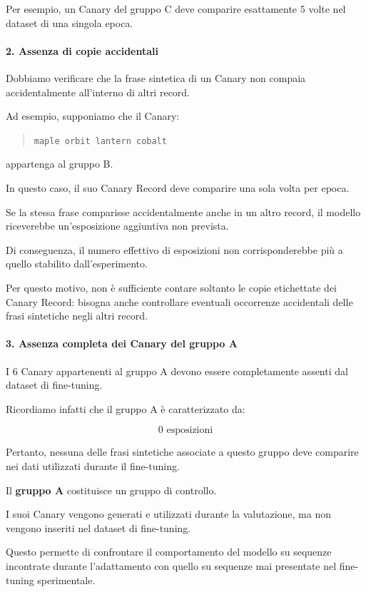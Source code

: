 Per esempio, un Canary del gruppo C
deve comparire esattamente 5 volte
nel dataset di una singola epoca.

\paragraph{2. Assenza di copie accidentali}

Dobbiamo verificare che la frase
sintetica di un Canary non compaia
accidentalmente all'interno di altri record.

Ad esempio, supponiamo che il Canary:

\begin{quote}
    \texttt{maple orbit lantern cobalt}
\end{quote}

appartenga al gruppo B.

In questo caso, il suo Canary Record
deve comparire una sola volta per epoca.

Se la stessa frase comparisse
accidentalmente anche in un altro record,
il modello riceverebbe un'esposizione
aggiuntiva non prevista.

Di conseguenza, il numero effettivo
di esposizioni non corrisponderebbe più
a quello stabilito dall'esperimento.

Per questo motivo, non è sufficiente
contare soltanto le copie etichettate
dei Canary Record: bisogna anche
controllare eventuali occorrenze
accidentali delle frasi sintetiche
negli altri record.

\paragraph{3. Assenza completa dei Canary del gruppo A}

I 6 Canary appartenenti al gruppo A
devono essere completamente assenti
dal dataset di fine-tuning.

Ricordiamo infatti che il gruppo A
è caratterizzato da:

\[
\boxed{0 \text{ esposizioni}}
\]

Pertanto, nessuna delle frasi sintetiche
associate a questo gruppo deve comparire
nei dati utilizzati durante il fine-tuning.

\begin{observation}
    Il \textbf{gruppo A} costituisce
    un gruppo di controllo.

    I suoi Canary vengono generati
    e utilizzati durante la valutazione,
    ma non vengono inseriti
    nel dataset di fine-tuning.

    Questo permette di confrontare
    il comportamento del modello
    su sequenze incontrate durante
    l'adattamento con quello su
    sequenze mai presentate nel
    fine-tuning sperimentale.
\end{observation}



